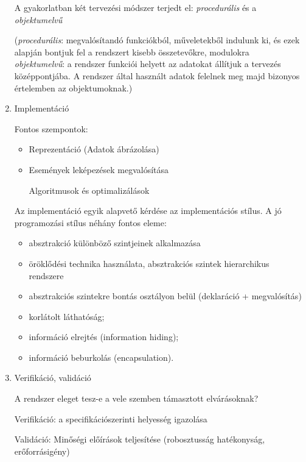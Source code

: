 \documentclass[margin=0px]{article}
\begin{document}
\begin{enumerate}
          A gyakorlatban két tervezési módszer terjedt el:
          \textit{procedurális} és a \textit{objektumelvű}

          (\textit{procedurális}: megvalósítandó funkciókból, műveletekből indulunk ki, és ezek alapján bontjuk fel a rendszert kisebb összetevőkre, modulokra\\
          \textit{objektumelvű}: a rendszer funkciói helyett az
          adatokat állítjuk a tervezés középpontjába. A rendszer által használt
          adatok felelnek meg majd bizonyos értelemben az objektumoknak.)

    \item Implementáció

          Fontos szempontok:
          \begin{itemize}
              \item Reprezentáció (Adatok ábrázolása)
              \item Események leképezések megvalósítása

                    Algoritmusok és optimalizálások
          \end{itemize}

          Az implementáció egyik alapvető kérdése az implementációs stílus.
          A jó programozási stílus néhány fontos eleme:
          \begin{itemize}
              \item absztrakció különböző szintjeinek alkalmazása
              \item öröklődési technika használata, absztrakciós szintek hierarchikus
                    rendszere
              \item absztrakciós szintekre bontás osztályon belül (deklaráció + megvalósítás)
              \item korlátolt láthatóság;
              \item információ elrejtés (information hiding);
              \item információ beburkolás (encapsulation).
          \end{itemize}

    \item Verifikáció, validáció

          A rendszer eleget tesz-e a vele szemben támasztott elvárásoknak?

          Verifikáció: a specifikációszerinti helyesség igazolása

          Validáció: Minőségi előírások teljesítése (robosztusság hatékonyság, erőforrásigény)


\end{enumerate}
\end{document}
